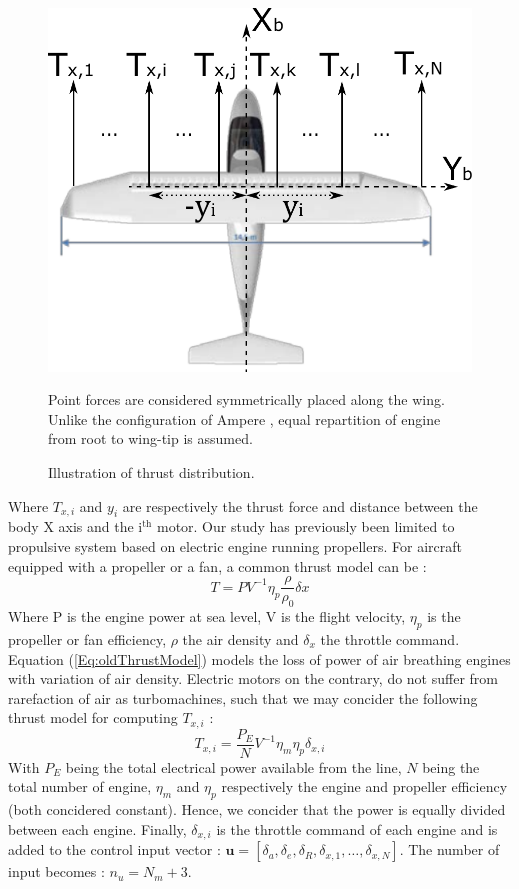 \begin{figure}[hbt!]
	\centering
	\includegraphics[width=.6\textwidth]{AmpereTop}
	\caption{Illustration of thrust distribution.} Point forces are considered symmetrically placed along the wing. Unlike the configuration of Ampere \cite{Ampere_concept}, equal repartition of engine from root to wing-tip is assumed. \label{fig:AmpereTop}
\end{figure}

Where $T_{x,i}$ and $y_i$ are respectively the thrust force and distance between the body X axis and the i$^{\text{th}}$ motor. 
Our study has previously been limited to propulsive system based on electric engine running propellers. For aircraft equipped with a propeller or a fan, a common thrust model can be \cite{SachsElectricPerf}:
\begin{equation}
	T=PV^{-1} \eta_p \frac{\rho}{\rho_0} \delta x \label{Eq:oldThrustModel}
\end{equation}
Where P is the engine power at sea level, V is the flight velocity, $\eta_p$ is the propeller or fan efficiency, $\rho$ the air density and $\delta_x$ the throttle command. Equation (\ref{Eq:oldThrustModel}) models the loss of power of air breathing engines with variation of air density. Electric motors on the contrary, do not suffer from rarefaction of air as turbomachines, such that we may concider the following thrust model for computing $T_{x,i}$ \cite{SachsElectricPerf}:
\begin{equation}
	T_{x,i}=\frac{P_E}{N}V^{-1}\eta_m\eta_p \delta_{x,i}
\end{equation}
With $P_E$ being the total electrical power available from the line, $N$ being the total number of engine, $\eta_m$ and $\eta_p$ respectively the engine and propeller efficiency (both concidered constant). Hence, we concider that the power is equally divided between each engine. Finally, $\delta_{x,i}$ is the throttle command of each engine and is added to the control input vector : $\textbf{u}=[\delta_a , \delta_e , \delta_R , \delta_{x,1} , \dots , \delta_{x,N}]$. The number of input becomes : $n_u=N_m+3$.

